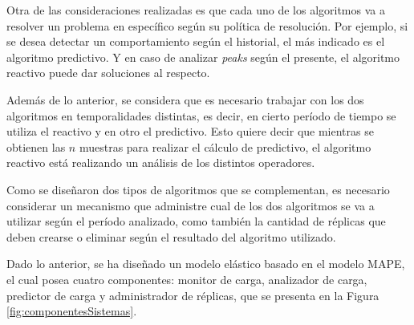 
\normalsize{Otra de las consideraciones realizadas es que cada uno de los algoritmos va a resolver un problema en específico según su política de resolución. Por ejemplo, si se desea detectar un comportamiento según el historial, el más indicado es el algoritmo predictivo. Y en caso de analizar \textit{peaks} según el presente, el algoritmo reactivo puede dar soluciones al respecto.}

Además de lo anterior, se considera que es necesario trabajar con los dos algoritmos en temporalidades distintas, es decir, en cierto período de tiempo se utiliza el reactivo y en otro el predictivo. Esto quiere decir que mientras se obtienen las $n$ muestras para realizar el cálculo de predictivo, el algoritmo reactivo está realizando un análisis de los distintos operadores.


Como se diseñaron dos tipos de algoritmos que se complementan, es necesario considerar un mecanismo que administre cual de los dos algoritmos se va a utilizar según el período analizado, como también la cantidad de réplicas que deben crearse o eliminar según el resultado del algoritmo utilizado.

Dado lo anterior, se ha diseñado un modelo elástico \normalsize{basado en el modelo MAPE}\citep{jacob2004practical}\normalsize{, el cual posea cuatro componentes}: monitor de carga, analizador de carga, predictor de carga y administrador de réplicas, que se presenta en la Figura \ref{fig:componentesSistemas}.

